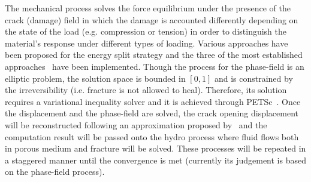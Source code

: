 The mechanical process solves the force equilibrium under the presence of the crack (damage) field in which the damage is accounted differently depending on the state of the load (e.g. compression or tension) in order to distinguish the material's response under different types of loading.
Various approaches have been proposed for the energy split strategy and the three of the most established approaches~\cite{Amor2009,Miehe2010a,Freddi2010} have been implemented.
Though the process for the phase-field is an elliptic problem, the solution space is bounded in $[0,1]$ and is constrained by the irreversibility (i.e. fracture is not allowed to heal).
Therefore, its solution requires a variational inequality solver and it is achieved through PETSc~\cite{petsc-user-ref, petsc-web-page}.
Once the displacement and the phase-field are solved, the crack opening displacement will be reconstructed following an approximation proposed by~\cite{Yoshioka2020} and the computation result will be passed onto the hydro process where fluid flows both in porous medium and fracture will be solved.
These processes will be repeated in a staggered manner until the convergence is met (currently its judgement is based on the phase-field process).
\\
